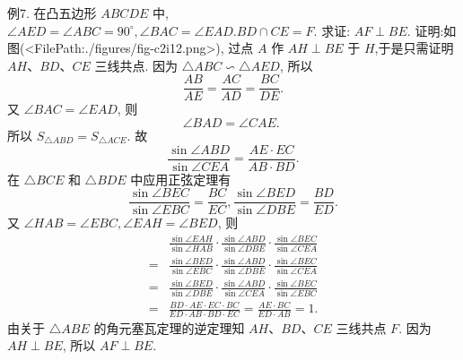 例7. 在凸五边形 $A B C D E$ 中, $\angle A E D=\angle A B C=90^{\circ}, \angle B A C= \angle E A D . B D \cap C E=F$. 求证: $A F \perp B E$.
证明:如图(<FilePath:./figures/fig-c2i12.png>), 过点 $A$ 作 $A H \perp B E$ 于 $H$,于是只需证明 $A H 、 B D 、 C E$ 三线共点.
因为 $\triangle A B C \backsim \triangle A E D$, 所以
$$
\frac{A B}{A E}=\frac{A C}{A D}=\frac{B C}{D E} .
$$
又 $\angle B A C=\angle E A D$, 则
$$
\angle B A D=\angle C A E \text {. }
$$
所以 $S_{\triangle A B D}=S_{\triangle A C E}$.
故
$$
\frac{\sin \angle A B D}{\sin \angle C E A}=\frac{A E \cdot E C}{A B \cdot B D} . \label{eq1}
$$
在 $\triangle B C E$ 和 $\triangle B D E$ 中应用正弦定理有
$$
\frac{\sin \angle B E C}{\sin \angle E B C}=\frac{B C}{E C}, \frac{\sin \angle B E D}{\sin \angle D B E}=\frac{B D}{E D} . \label{eq2}
$$
又 $\angle H A B=\angle E B C, \angle E A H=\angle B E D$, 则
$$
\begin{aligned}
& \frac{\sin \angle E A H}{\sin \angle H A B} \cdot \frac{\sin \angle A B D}{\sin \angle D B E} \cdot \frac{\sin \angle B E C}{\sin \angle C E A} \\
= & \frac{\sin \angle B E D}{\sin \angle E B C} \cdot \frac{\sin \angle A B D}{\sin \angle D B E} \cdot \frac{\sin \angle B E C}{\sin \angle C E A} \\
= & \frac{\sin \angle B E D}{\sin \angle D B E} \cdot \frac{\sin \angle A B D}{\sin \angle C E A} \cdot \frac{\sin \angle B E C}{\sin \angle E B C} \\
= & \frac{B D \cdot A E \cdot E C \cdot B C}{E D \cdot A B \cdot B D \cdot E C}=\frac{A E \cdot B C}{E D \cdot A B}=1 .
\end{aligned}
$$
由关于 $\triangle A B E$ 的角元塞瓦定理的逆定理知 $A H 、 B D 、 C E$ 三线共点 $F$. 因为 $A H \perp B E$, 所以 $A F \perp B E$.



